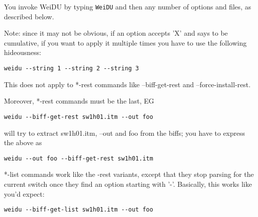 \documentclass{article}
\begin{document}
You invoke WeiDU by typing {\tt WeiDU} and then any number of options and
files, as described below.

Note: since it may not be obvious, if an option accepts 'X' and says to be
cumulative, if you want to apply it multiple times you have to use the following
hideousness:
\begin{verbatim}
weidu --string 1 --string 2 --string 3
\end{verbatim}
This does not apply to *-rest commands like --biff-get-rest and --force-install-rest.

Moreover, *-rest commands must be the last, EG
\begin{verbatim}
weidu --biff-get-rest sw1h01.itm --out foo
\end{verbatim}
will try to extract sw1h01.itm, --out and foo from the biffs; you have to express the above as
\begin{verbatim}
weidu --out foo --biff-get-rest sw1h01.itm
\end{verbatim}

*-list commands work like the -rest variants, except that they stop parsing for the current
switch once they find an option starting with '-'. Basically, this works like you'd expect:
\begin{verbatim}
weidu --biff-get-list sw1h01.itm --out foo
\end{verbatim}


\
\end{document}

